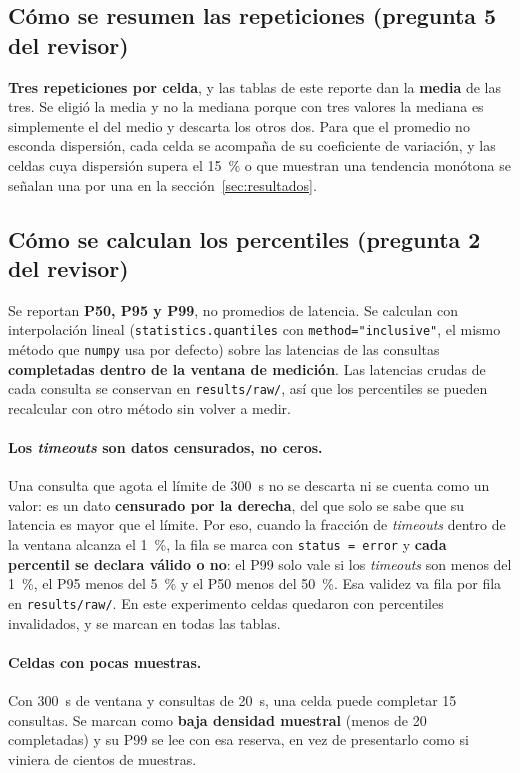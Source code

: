 \subsection{Cómo se resumen las repeticiones (pregunta 5 del revisor)}
\label{sec:resumen}

\textbf{Tres repeticiones por celda}, y las tablas de este reporte dan la
\textbf{media} de las tres. Se eligió la media y no la mediana porque con tres
valores la mediana es simplemente el del medio y descarta los otros dos. Para que
el promedio no esconda dispersión, cada celda se acompaña de su coeficiente de
variación, y las celdas cuya dispersión supera el 15~\% o que muestran una
tendencia monótona se señalan una por una en la sección~\ref{sec:resultados}.

\subsection{Cómo se calculan los percentiles (pregunta 2 del revisor)}

Se reportan \textbf{P50, P95 y P99}, no promedios de latencia. Se calculan con
interpolación lineal (\texttt{statistics.quantiles} con
\texttt{method="inclusive"}, el mismo método que \texttt{numpy} usa por defecto)
sobre las latencias de las consultas \textbf{completadas dentro de la ventana de
medición}. Las latencias crudas de cada consulta se conservan en
\texttt{results/raw/}, así que los percentiles se pueden recalcular con otro
método sin volver a medir.

\paragraph{Los \emph{timeouts} son datos censurados, no ceros.}
Una consulta que agota el límite de 300~s no se descarta ni se cuenta como un
valor: es un dato \textbf{censurado por la derecha}, del que solo se sabe que su
latencia es mayor que el límite. Por eso, cuando la fracción de \emph{timeouts}
dentro de la ventana alcanza el 1~\%, la fila se marca con
\texttt{status = error} y \textbf{cada percentil se declara válido o no}: el P99
solo vale si los \emph{timeouts} son menos del 1~\%, el P95 menos del 5~\% y el
P50 menos del 50~\%. Esa validez va fila por fila en \texttt{results/raw/}. En
este experimento \cifraCeldasCensuradas{} celdas quedaron con percentiles
invalidados, y se marcan en todas las tablas.

\paragraph{Celdas con pocas muestras.}
Con 300~s de ventana y consultas de 20~s, una celda puede completar 15
consultas. Se marcan como \textbf{baja densidad muestral} (menos de 20
completadas) y su P99 se lee con esa reserva, en vez de presentarlo como si
viniera de cientos de muestras.

